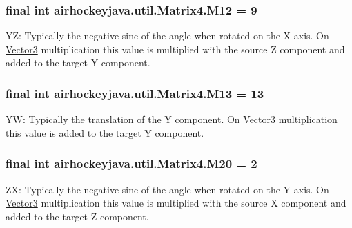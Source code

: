 \subsubsection[{M12}]{\setlength{\rightskip}{0pt plus 5cm}final int airhockeyjava.\+util.\+Matrix4.\+M12 = 9\hspace{0.3cm}{\ttfamily [static]}}\label{classairhockeyjava_1_1util_1_1_matrix4_a9b1b021afa2c59e3fc33c40640407d3c}
Y\+Z\+: Typically the negative sine of the angle when rotated on the X axis. On \hyperlink{classairhockeyjava_1_1util_1_1_vector3}{Vector3} multiplication this value is multiplied with the source Z component and added to the target Y component. \hypertarget{classairhockeyjava_1_1util_1_1_matrix4_a53bb7a464da8feab986b2e1a97bb62e1}{}
\subsubsection[{M13}]{\setlength{\rightskip}{0pt plus 5cm}final int airhockeyjava.\+util.\+Matrix4.\+M13 = 13\hspace{0.3cm}{\ttfamily [static]}}\label{classairhockeyjava_1_1util_1_1_matrix4_a53bb7a464da8feab986b2e1a97bb62e1}
Y\+W\+: Typically the translation of the Y component. On \hyperlink{classairhockeyjava_1_1util_1_1_vector3}{Vector3} multiplication this value is added to the target Y component. \hypertarget{classairhockeyjava_1_1util_1_1_matrix4_a1676daab371b7497cda50daed0cc8b3f}{}
\subsubsection[{M20}]{\setlength{\rightskip}{0pt plus 5cm}final int airhockeyjava.\+util.\+Matrix4.\+M20 = 2\hspace{0.3cm}{\ttfamily [static]}}\label{classairhockeyjava_1_1util_1_1_matrix4_a1676daab371b7497cda50daed0cc8b3f}
Z\+X\+: Typically the negative sine of the angle when rotated on the Y axis. On \hyperlink{classairhockeyjava_1_1util_1_1_vector3}{Vector3} multiplication this value is multiplied with the source X component and added to the target Z component. \hypertarget{classairhockeyjava_1_1util_1_1_matrix4_a238f57ac1896ecb261e4d6ad0ef70c08}{}

